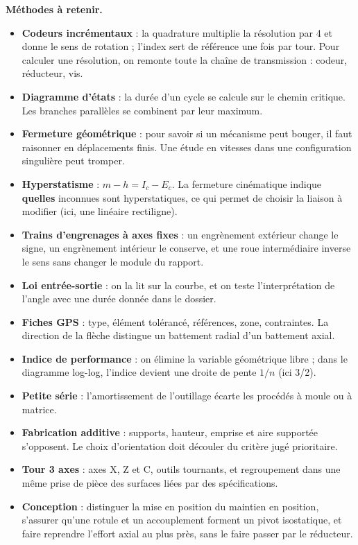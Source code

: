 \documentclass[11pt,a4paper]{article}
\providecommand{\tightlist}{\setlength{\itemsep}{0pt}\setlength{\parskip}{0pt}}
\begin{document}
\textbf{Méthodes à retenir.}

\begin{itemize}
\tightlist
\item
  \textbf{Codeurs incrémentaux} : la quadrature multiplie la résolution par 4 et donne le sens de rotation ; l'index sert de référence une fois par tour. Pour calculer une résolution, on remonte toute la chaîne de transmission : codeur, réducteur, vis.
\item
  \textbf{Diagramme d'états} : la durée d'un cycle se calcule sur le chemin critique. Les branches parallèles se combinent par leur maximum.
\item
  \textbf{Fermeture géométrique} : pour savoir si un mécanisme peut bouger, il faut raisonner en déplacements finis. Une étude en vitesses dans une configuration singulière peut tromper.
\item
  \textbf{Hyperstatisme} : \(m - h = I_c - E_c\). La fermeture cinématique indique \textbf{quelles} inconnues sont hyperstatiques, ce qui permet de choisir la liaison à modifier (ici, une linéaire rectiligne).
\item
  \textbf{Trains d'engrenages à axes fixes} : un engrènement extérieur change le signe, un engrènement intérieur le conserve, et une roue intermédiaire inverse le sens sans changer le module du rapport.
\item
  \textbf{Loi entrée-sortie} : on la lit sur la courbe, et on teste l'interprétation de l'angle avec une durée donnée dans le dossier.
\item
  \textbf{Fiches GPS} : type, élément tolérancé, références, zone, contraintes. La direction de la flèche distingue un battement radial d'un battement axial.
\item
  \textbf{Indice de performance} : on élimine la variable géométrique libre ; dans le diagramme log-log, l'indice devient une droite de pente \(1/n\) (ici 3/2).
\item
  \textbf{Petite série} : l'amortissement de l'outillage écarte les procédés à moule ou à matrice.
\item
  \textbf{Fabrication additive} : supports, hauteur, emprise et aire supportée s'opposent. Le choix d'orientation doit découler du critère jugé prioritaire.
\item
  \textbf{Tour 3 axes} : axes X, Z et C, outils tournants, et regroupement dans une même prise de pièce des surfaces liées par des spécifications.
\item
  \textbf{Conception} : distinguer la mise en position du maintien en position, s'assurer qu'une rotule et un accouplement forment un pivot isostatique, et faire reprendre l'effort axial au plus près, sans le faire passer par le réducteur.
\end{itemize}
\end{document}
